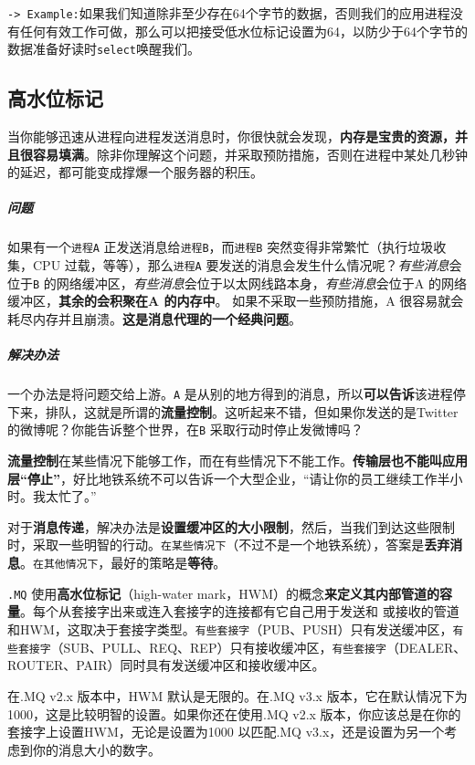 \documentclass[UTF8,a4paper,12pt]{ctexbook}
\begin{document}
			\verb|-> Example:|如果我们知道除非至少存在64个字节的数据，否则我们的应用进程没有任何有效工作可做，那么可以把接受低水位标记设置为64，以防少于64个字节的数据准备好读时\verb|select|唤醒我们。
		\subsection{高水位标记}
			当你能够迅速从进程向进程发送消息时，你很快就会发现，\textbf{内存是宝贵的资源，并且很容易填满}。除非你理解这个问题，并采取预防措施，否则在进程中某处几秒钟的延迟，都可能变成撑爆一个服务器的积压。
			
			\subparagraph{问题}如果有一个\verb|进程A| 正发送消息给\verb|进程B|，而\verb|进程B| 突然变得非常繁忙（执行垃圾收集，CPU 过载，等等），那么\verb|进程A| 要发送的消息会发生什么情况呢？\textit{有些消息}会位于\verb|B| 的网络缓冲区，\textit{有些消息}会位于以太网线路本身，\textit{有些消息}会位于A 的网络缓冲区，\textbf{其余的}\textbf{会积聚在A 的内存中}。
			如果不采取一些预防措施，A 很容易就会耗尽内存并且崩溃。\textbf{这是消息代理的一个经典问题}。
		
			\subparagraph{解决办法}一个办法是将问题交给上游。\verb|A| 是从别的地方得到的消息，所以\textbf{可以告诉}该进程停下来，排队，这就是所谓的\textbf{流量控制}。这听起来不错，但如果你发送的是Twitter 的微博呢？你能告诉整个世界，在\verb|B| 采取行动时停止发微博吗？
			
			\textbf{流量控制}在某些情况下能够工作，而在有些情况下不能工作。\textbf{传输层也不能叫应用层“停止”}，好比地铁系统不可以告诉一个大型企业，“请让你的员工继续工作半小时。我太忙了。”
			
			对于\textbf{消息传递}，解决办法是\textbf{设置缓冲区的大小限制}，然后，当我们到达这些限制时，采取一些明智的行动。\verb|在某些情况下|（不过不是一个地铁系统），答案是\textbf{丢弃消息}。\verb|在其他情况下|，最好的策略是\textbf{等待}。
			
			\verb|.MQ| 使用\textbf{高水位标记}（high-water mark，HWM）的概念\textbf{来定义其内部管道的容量}。每个从套接字出来或连入套接字的连接都有它自己用于发送和 或接收的管道和HWM，这取决于套接字类型。\verb|有些套接字|（PUB、PUSH）只有发送缓冲区，\verb|有些套接字|（SUB、PULL、REQ、REP）只有接收缓冲区，\verb|有些套接字|（DEALER、ROUTER、PAIR）同时具有发送缓冲区和接收缓冲区。
			
			在.MQ v2.x 版本中，HWM 默认是无限的。在.MQ v3.x 版本，它在默认情况下为1000，这是比较明智的设置。如果你还在使用.MQ v2.x 版本，你应该总是在你的套接字上设置HWM，无论是设置为1000 以匹配.MQ v3.x，还是设置为另一个考虑到你的消息大小的数字。
			
\end{document}
